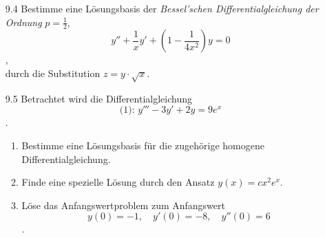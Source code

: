 \documentclass{../HM}
\begin{document}
\begin{enumerate}
		\item [9.4] Bestimme eine Lösungsbasis der \textit{Bessel'schen Differentialgleichung der Ordnung} $p=\frac{1}{2}$,
		$$y''+\frac{1}{x}y'+(1-\frac{1}{4x^2})y=0$$,\\
		durch die Substitution $z=y\cdot\sqrt{x}$.
		
		\begin{eqnn}
			\eqnspace
		\end{eqnn}
		
		\item [9.5] Betrachtet wird die Differentialgleichung
		$$\text{(1): }y'''-3y'+2y=9e^x$$.\\
		
		\begin{enumerate}
			\item Bestimme eine Lösungsbasis für die zugehörige homogene Differentialgleichung.
			
			\item Finde eine spezielle Lösung durch den Ansatz $y(x)=cx^2e^x$.
			
			\item Löse das Anfangswertproblem zum Anfangswert
			$$y(0)=-1,\quad y'(0)=-8,\quad y''(0)=6$$.
		\end{enumerate}
	\end{enumerate}
\end{document}
